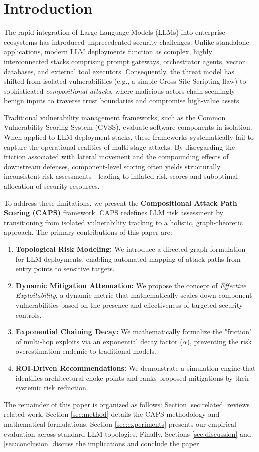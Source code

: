 \section{Introduction}
\label{sec:intro}

The rapid integration of Large Language Models (LLMs) into enterprise ecosystems has introduced unprecedented security challenges. Unlike standalone applications, modern LLM deployments function as complex, highly interconnected stacks comprising prompt gateways, orchestrator agents, vector databases, and external tool executors. Consequently, the threat model has shifted from isolated vulnerabilities (e.g., a simple Cross-Site Scripting flaw) to sophisticated \textit{compositional attacks}, where malicious actors chain seemingly benign inputs to traverse trust boundaries and compromise high-value assets.

Traditional vulnerability management frameworks, such as the Common Vulnerability Scoring System (CVSS), evaluate software components in isolation. When applied to LLM deployment stacks, these frameworks systematically fail to capture the operational realities of multi-stage attacks. By disregarding the friction associated with lateral movement and the compounding effects of downstream defenses, component-level scoring often yields structurally inconsistent risk assessments---leading to inflated risk scores and suboptimal allocation of security resources.

To address these limitations, we present the \textbf{Compositional Attack Path Scoring (CAPS)} framework. CAPS redefines LLM risk assessment by transitioning from isolated vulnerability tracking to a holistic, graph-theoretic approach. The primary contributions of this paper are:
\begin{enumerate}
    \item \textbf{Topological Risk Modeling:} We introduce a directed graph formulation for LLM deployments, enabling automated mapping of attack paths from entry points to sensitive targets.
    \item \textbf{Dynamic Mitigation Attenuation:} We propose the concept of \textit{Effective Exploitability}, a dynamic metric that mathematically scales down component vulnerabilities based on the presence and effectiveness of targeted security controls.
    \item \textbf{Exponential Chaining Decay:} We mathematically formalize the "friction" of multi-hop exploits via an exponential decay factor ($\alpha$), preventing the risk overestimation endemic to traditional models.
    \item \textbf{ROI-Driven Recommendations:} We demonstrate a simulation engine that identifies architectural choke points and ranks proposed mitigations by their systemic risk reduction.
\end{enumerate}

The remainder of this paper is organized as follows: Section \ref{sec:related} reviews related work. Section \ref{sec:method} details the CAPS methodology and mathematical formulations. Section \ref{sec:experiments} presents our empirical evaluation across standard LLM topologies. Finally, Sections \ref{sec:discussion} and \ref{sec:conclusion} discuss the implications and conclude the paper.

